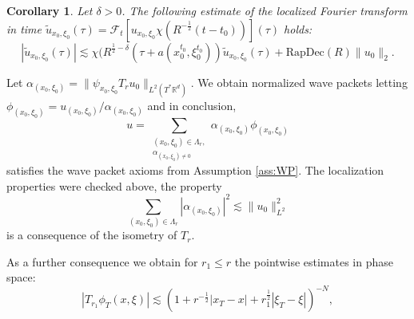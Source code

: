 \documentclass{amsart}
\newtheorem{corollary}[theorem]{Corollary}
\theoremstyle{definition}
\newcommand{\R}{\mathbb{R}}
\begin{document}
\begin{corollary}
\label{cor:TimeFrequencyLocalization}
Let $\delta > 0$. The following estimate of the localized Fourier transform in time $ \tilde{u}_{x_0,\xi_0}(\tau) =  \mathcal{F}_t[ u_{x_0,\xi_0} \chi(R^{-\frac{1}{2}}(t-t_0))](\tau )$ holds:
\begin{equation}
\label{eq:FrequencyLocalizationWavePacketTime}
| \tilde{u}_{x_0,\xi_0}(\tau) | \lesssim \chi(R^{\frac{1}{2} - \delta} (\tau + a(x_0^{t_0},\xi_0^{t_0})) \tilde{u}_{x_0,\xi_0}(\tau) + \text{RapDec}(R) \| u_0 \|_2.
\end{equation}
\end{corollary} 

Let $\alpha_{(x_0,\xi_0)} = \| \psi_{x_0,\xi_0} T_r u_0 \|_{L^2(T^* \R^d)}$. We obtain normalized wave packets letting $\phi_{(x_0,\xi_0)} = u_{(x_0,\xi_0)} / \alpha_{(x_0,\xi_0)}$ and in conclusion,
\begin{equation*}
    u = \sum_{\substack{(x_0,\xi_0) \in \Lambda_r, \\ \alpha_{(x_0,\xi_0) \neq 0}}} \alpha_{(x_0,\xi_0)} \phi_{(x_0,\xi_0)}
\end{equation*}
satisfies the wave packet axioms from Assumption \ref{ass:WP}. The localization properties were checked above, the property 
\begin{equation*}
    \sum_{(x_0,\xi_0) \in \Lambda_r} |\alpha_{(x_0,\xi_0)}|^2 \lesssim \| u_0 \|_{L^2}^2
\end{equation*}
is a consequence of the isometry of $T_r$.

As a further consequence we obtain for $r_1 \leq r$ the pointwise estimates in phase space:
\begin{equation*}
|T_{r_1} \phi_T (x,\xi)| \lesssim (1 + r^{-\frac{1}{2}} |x_T - x| + r_1^{\frac{1}{2}} |\xi_T - \xi |)^{-N},
\end{equation*}
\end{document}
